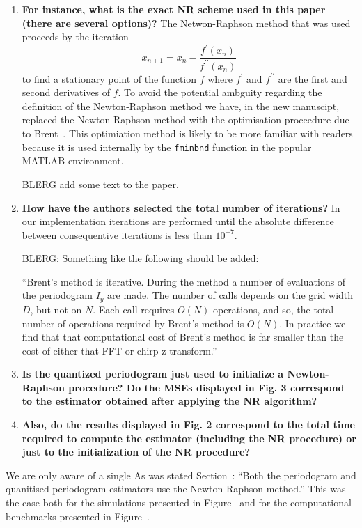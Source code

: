 \documentclass[a4paper,10pt]{article}
\begin{document}
\begin{enumerate}
\begin{enumerate}
\item \textbf{For instance, what is the exact NR scheme used in this paper (there are several options)?}  The Netwon-Raphson method that was used proceeds by the iteration
\[
x_{n+1} = x_n - \frac{f^\prime(x_{n})}{f^{\prime\prime}(x_n)}
\]
to find a stationary point of the function $f$ where $f^\prime$ and $f^{\prime\prime}$ are the first and second derivatives of $f$.  To avoid the potential ambguity regarding the definition of the Newton-Raphson method we have, in the new manuscipt, replaced the Newton-Raphson method with the optimisation proceedure due to Brent~\cite[Ch.~5]{Brent_opt_no_derivs_1973}.  This optimiation method is likely to be more familiar with readers because it is used internally by the \texttt{fminbnd} function in the popular MATLAB environment. 

BLERG add some text to the paper.

\item \textbf{How have the authors selected the total number of iterations?} In our implementation iterations are performed until the absolute difference between consequentive iterations is less than $10^{-7}$.

BLERG: Something like the following should be added:

``Brent's method is iterative.  During the method a number of evaluations of the periodogram $I_y$ are made.  The number of calls depends on the grid width $D$, but not on $N$.  Each call requires $O(N)$ operations, and so, the total number of operations required by Brent's method is $O(N)$. In practice we find that that computational cost of Brent's method is far smaller than the cost of either that FFT or chirp-z transform.''

\item \textbf{Is the quantized periodogram
just used to initialize a Newton-Raphson procedure? Do the MSEs displayed
in Fig. 3 correspond to the estimator obtained after applying the NR algorithm?}

\item \textbf{Also, do the results displayed in Fig. 2 correspond to the total time
required to compute the estimator (including the NR procedure) or just to the
initialization of the NR procedure?}

\end{enumerate}

We are only aware of a single   As was stated Section~: ``Both the periodogram and quanitised periodogram estimators use the Newton-Raphson method.''  This was the case both for the simulations presented in Figure~ and for the computational benchmarks presented in Figure~.



\end{enumerate}
\end{document}
